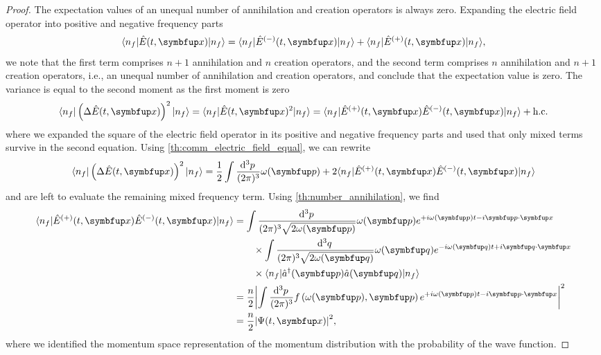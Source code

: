 \begin{proof}
	The expectation values of an unequal number of annihilation and creation operators is always zero.
	Expanding the electric field operator into positive and negative frequency parts
	\begin{equation}
		\bra{n_f}
		\hat{E}(t,\vb{x})
		\ket{n_f}
		=
		\bra{n_f}
		\hat{E}^{(-)}(t,\vb{x})
		\ket{n_f}
		+
		\bra{n_f}
		\hat{E}^{(+)}(t,\vb{x})
		\ket{n_f}
		,
	\end{equation}
	we note that the first term comprises $n+1$ annihilation and $n$ creation operators, and the second term comprises $n$ annihilation and $n+1$ creation operators, i.e., an unequal number of annihilation and creation operators, and conclude that the expectation value is zero.
	The variance is equal to the second moment as the first moment is zero
	\begin{equation}
		\bra{n_f}
		\left(
			\Delta
			\hat{E}(t,\vb{x})
		\right)^2
		\ket{n_f}
		=
		\bra{n_f}
		\hat{E}(t,\vb{x})^2
		\ket{n_f}
		=
		\bra{n_f}
		\hat{E}^{(+)}(t,\vb{x})
		\hat{E}^{(-)}(t,\vb{x})
		\ket{n_f}
		+
		\text{h.c.}
	\end{equation}
	where we expanded the square of the electric field operator in its positive and negative frequency parts and used that only mixed terms survive in the second equation.
	Using \cref{th:comm_electric_field_equal}, we can rewrite
	\begin{equation}
		\bra{n_f}
		\left(
			\Delta
			\hat{E}(t,\vb{x})
		\right)^2
		\ket{n_f}
		=
		\frac{1}{2}
		\int\frac{\dd[3]{p}}{(2\pi)^3}
		\omega(\vb{p})
		+		
		2
		\bra{n_f}
		\hat{E}^{(+)}(t,\vb{x})
		\hat{E}^{(-)}(t,\vb{x})
		\ket{n_f}
	\end{equation}
	and are left to evaluate the remaining mixed frequency term.
	Using \cref{th:number_annihilation}, we find
	\begin{equation}
		\begin{split}
			\bra{n_f}
			\hat{E}^{(+)}(t,\vb{x})
			\hat{E}^{(-)}(t,\vb{x})
			\ket{n_f}
			&=
			\int\frac{\dd[3]{p}}{(2\pi)^3\sqrt{2\omega(\vb{p})}}
			\omega(\vb{p})
			e^{+i\omega(\vb{p})t-i\vb{p}\vdot\vb{x}}
			\\
			&\qquad\times
			\int\frac{\dd[3]{q}}{(2\pi)^3\sqrt{2\omega(\vb{q})}}
			\omega(\vb{q})
			e^{-i\omega(\vb{q})t+i\vb{q}\vdot\vb{x}}
			\\
			&\qquad\times
			\bra{n_f}
			\hat{a}^\dagger(\vb{p})
			\hat{a}(\vb{q})
			\ket{n_f}
			\\
			&=
			\frac{n}{2}
			\abs*{
				\int\frac{\dd[3]{p}}{(2\pi)^3}
				f\left(\omega(\vb{p}),\vb{p}\right)
				e^{+i\omega(\vb{p})t-i\vb{p}\vdot\vb{x}}
			}^2
			\\
			&=
			\frac{n}{2}
			\abs*{\Psi(t,\vb{x})}^2
			,
		\end{split}
	\end{equation}
	where we identified the momentum space representation of the momentum distribution with the probability of the wave function.
\end{proof}
